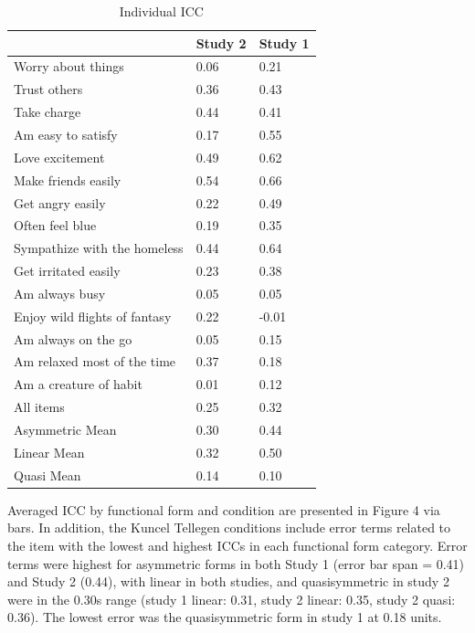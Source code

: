 \documentclass[
  ,jou]{apa6}
\begin{document}
\begin{table}[tbp]

\begin{center}
\begin{threeparttable}

\caption{\label{tab:Table 3}Individual ICC}

\begin{tabular}{lll}
\toprule
 & \multicolumn{1}{c}{Study 2} & \multicolumn{1}{c}{Study 1}\\
\midrule
Worry about things & 0.06 & 0.21\\
Trust others & 0.36 & 0.43\\
Take charge & 0.44 & 0.41\\
Am easy to satisfy & 0.17 & 0.55\\
Love excitement & 0.49 & 0.62\\
Make friends easily & 0.54 & 0.66\\
Get angry easily & 0.22 & 0.49\\
Often feel blue & 0.19 & 0.35\\
Sympathize with the homeless & 0.44 & 0.64\\
Get irritated easily & 0.23 & 0.38\\
Am always busy & 0.05 & 0.05\\
Enjoy wild flights of fantasy & 0.22 & -0.01\\
Am always on the go & 0.05 & 0.15\\
Am relaxed most of the time & 0.37 & 0.18\\
Am a creature of habit & 0.01 & 0.12\\
All items & 0.25 & 0.32\\
Asymmetric Mean & 0.30 & 0.44\\
Linear Mean & 0.32 & 0.50\\
Quasi Mean & 0.14 & 0.10\\
\bottomrule
\end{tabular}

\end{threeparttable}
\end{center}

\end{table}

Averaged ICC by functional form and condition are presented in Figure 4 via bars. In addition, the Kuncel Tellegen conditions include error terms related to the item with the lowest and highest ICCs in each functional form category. Error terms were highest for asymmetric forms in both Study 1 (error bar span = 0.41) and Study 2 (0.44), with linear in both studies, and quasisymmetric in study 2 were in the 0.30s range (study 1 linear: 0.31, study 2 linear: 0.35, study 2 quasi: 0.36). The lowest error was the quasisymmetric form in study 1 at 0.18 units.
\end{document}
